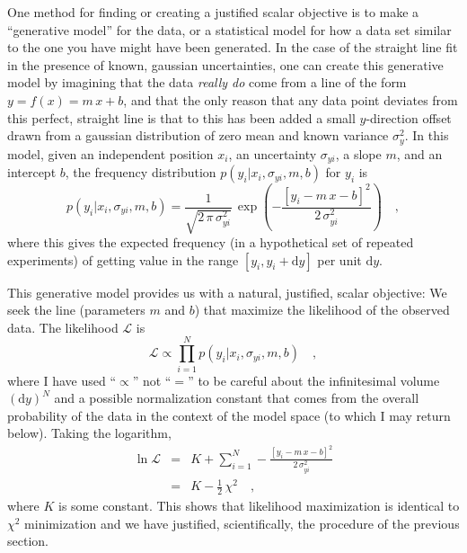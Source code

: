 \documentclass[12pt]{article}
\renewcommand{\d}{\mathrm{d}}
\newcommand{\like}{\mathscr{L}}
\begin{document}
One method for finding or creating a justified scalar objective is to
make a ``generative model'' for the data, or a statistical model for
how a data set similar to the one you have might have been generated.
In the case of the straight line fit in the presence of known,
gaussian uncertainties, one can create this generative model by
imagining that the data \emph{really do} come from a line of the form
$y = f(x) = m\,x+b$, and that the only reason that any data point
deviates from this perfect, straight line is that to this has been
added a small $y$-direction offset drawn from a gaussian distribution
of zero mean and known variance $\sigma_y^2$.  In this model, given an
independent position $x_i$, an uncertainty $\sigma_{yi}$, a slope $m$,
and an intercept $b$, the frequency distribution
$p(y_i|x_i,\sigma_{yi},m,b)$ for $y_i$ is
\begin{equation}
p(y_i|x_i,\sigma_{yi},m,b) = \frac{1}{\sqrt{2\,\pi\,\sigma_{yi}^2}}
 \,\exp\left(-\frac{[y_i - m\,x - b]^2}{2\,\sigma_{yi}^2}\right) \quad ,
\end{equation}
where this gives the expected frequency (in a hypothetical set of
repeated experiments) of getting value in the range $[y_i,y_i+\d y]$
per unit $\d y$.

This generative model provides us with a natural, justified, scalar
objective: We seek the line (parameters $m$ and $b$) that maximize the
likelihood of the observed data.  The likelihood $\like$ is
\begin{equation}\label{eq:like}
\like \propto \prod_{i=1}^N p(y_i|x_i,\sigma_{yi},m,b) \quad ,
\end{equation}
where I have used ``$\propto$'' not ``$=$'' to be careful about the
infinitesimal volume $(\d y)^N$ and a possible normalization constant
that comes from the overall probability of the data in the context of
the model space (to which I may return below).  Taking the logarithm,
\begin{eqnarray}\displaystyle
\ln\like
 & = & K + \sum_{i=1}^N -\frac{[y_i - m\,x - b]^2}{2\,\sigma_{yi}^2} \nonumber\\
 & = & K - \frac{1}{2}\,\chi^2 \quad ,
\end{eqnarray}
where $K$ is some constant.  This shows that likelihood maximization
is identical to $\chi^2$ minimization and we have justified,
scientifically, the procedure of the previous section.
\end{document}
